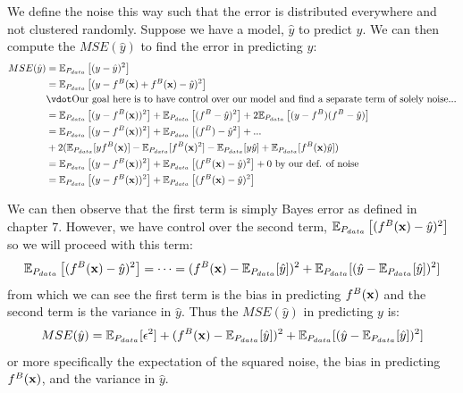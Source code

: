 We define the noise this way such that the error is distributed everywhere and not clustered randomly. Suppose we have a model, $\hat{y}$ to predict $y$. We can then compute the $MSE(\hat{y})$ to find the error in predicting $y$:
\begin{align*}
    MSE(\hat{y}) &= \Ev_{P_{data}}\left[(y - \hat{y})^2\right] \\
    & = \Ev_{P_{data}}\left[(y - f^B(\vx) + f^B(\vx) - \hat{y})^2 \right] \\
    & \vdot \text{Our goal here is to have control over our model and find a separate term of solely noise...} \\
    & = \Ev_{P_{data}}\left[(y - f^B(\vx))^2\right] + \Ev_{P_{data}}\left[(f^B - \hat{y})^2 \right]+ 2\Ev_{P_{data}}\left[(y-f^B)(f^B-\hat{y}) \right] \\ 
    & =\Ev_{P_{data}}\left[(y - f^B(\vx))^2\right] + \Ev_{P_{data}}\left[(f^B) - \hat{y}^2 \right]+...\\
    &+2(\Ev_{P_{data}}[yf^B(\vx)]- \Ev_{P_{data}}[f^B(\vx)^2]-\Ev_{P_{data}}[y\hat{y}]+\Ev_{P_{data}}[f^B(\vx)\hat{y}])\\
    & = \Ev_{P_{data}}\left[(y - f^B(\vx))^2\right] + \Ev_{P_{data}}\left[(f^B(\vx) - \hat{y})^2 \right] + 0\text{    by our def. of noise} \\
    & = \Ev_{P_{data}}\left[(y - f^B(\vx))^2\right] + \Ev_{P_{data}}\left[(f^B(\vx) - \hat{y})^2 \right]
\end{align*}

We can then observe that the first term is simply Bayes error as defined in chapter 7. However, we have control over the second term, $\Ev_{P_{data}}\left[(f^B(\vx) - \hat{y})^2 \right]$ so we will proceed with this term: 
$$\Ev_{P_{data}}\left[(f^B(\vx) - \hat{y})^2 \right]  = \dots = (f^B(\vx)- \Ev_{P_{data}}[\hat{y}])^2 + \Ev_{P_{data}}[(\hat{y}-\Ev_{P_{data}}[\hat{y}])^2]$$
from which we can see the first term is the bias in predicting $f^B(\vx)$ and the second term is the variance in $\hat{y}$. Thus the $MSE(\hat{y})$ in predicting $y$ is: 
$$MSE(\hat{y}) = \Ev_{P_{data}}[\epsilon^2] + (f^B(\vx)- \Ev_{P_{data}}[\hat{y}])^2 +  \Ev_{P_{data}}[(\hat{y}-\Ev_{P_{data}}[\hat{y}])^2] $$
or more specifically the expectation of the squared noise, the bias in predicting $f^B(\vx)$, and the variance in $\hat{y}$.
